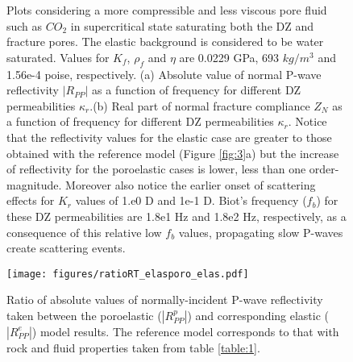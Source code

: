 \documentclass[draft,jgrga]{agutexSI2019}
\begin{document}
\begin{figure}[hp]
\centering
\caption {Plots considering a more compressible and less viscous pore fluid such as $CO_2$ in supercritical state saturating both the DZ and fracture pores. The elastic background is considered to be water saturated. Values for $K_f$, $\rho_f$ and $\eta$ are 0.0229 GPa, 693 $kg/m^3$ and 1.56e-4 poise, respectively. (a) Absolute value of normal P-wave reflectivity $|R_{PP}|$ as a function of frequency for different DZ permeabilities $\kappa_r$.(b) Real part of normal fracture compliance $Z_N$ as a function of frequency for different DZ permeabilities $\kappa_r$. Notice that the reflectivity values for the elastic case are greater to those obtained with the reference model (Figure \ref{fig:3}a) but the increase of reflectivity for the poroelastic cases is lower, less than one order-magnitude. Moreover also notice the earlier onset of scattering effects for $K_r$ values of 1.e0 D and 1e-1 D. Biot's frequency ($f_b$) for these DZ permeabilities are 1.8e1 Hz and 1.8e2 Hz, respectively, as a consequence of this relative low $f_b$ values, propagating slow P-waves create scattering events.}
\label{fig:9}
\end{figure}

 \begin{figure}[!ht]
\centering
        \texttt{[image: figures/ratioRT\_elasporo\_elas.pdf]}
\caption {Ratio of absolute values of normally-incident P-wave reflectivity taken between the poroelastic ($|R_{PP}^p|$) and corresponding elastic ($|R_{PP}^e|$) model results. The reference model corresponds to that with rock and fluid properties taken from table \ref{table:1}.}
\label{fig:10}
\end{figure}
\end{document}
